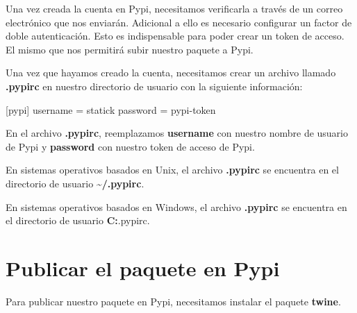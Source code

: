 \documentclass[
  a4paper,
  DIV=11,
  numbers=noendperiod,
  onepage,
  openany]{scrreprt}
\newenvironment{Shaded}{\begin{snugshade}}{\end{snugshade}}
\newcommand{\NormalTok}[1]{\textcolor[rgb]{0.00,0.23,0.31}{#1}}
\begin{document}
\begin{tcolorbox}
\begin{tcolorbox}
Una vez creada la cuenta en Pypi, necesitamos verificarla a través de un
correo electrónico que nos enviarán. Adicional a ello es necesario
configurar un factor de doble autenticación. Esto es indispensable para
poder crear un token de acceso. El mismo que nos permitirá subir nuestro
paquete a Pypi.

\end{tcolorbox}

Una vez que hayamos creado la cuenta, necesitamos crear un archivo
llamado \textbf{.pypirc} en nuestro directorio de usuario con la
siguiente información:

\begin{Shaded}
\begin{Highlighting}[]
\NormalTok{[pypi]}
\NormalTok{  username = statick}
\NormalTok{  password = pypi{-}token}
\end{Highlighting}
\end{Shaded}

En el archivo \textbf{.pypirc}, reemplazamos \textbf{username} con
nuestro nombre de usuario de Pypi y \textbf{password} con nuestro token
de acceso de Pypi.

\begin{tcolorbox}[enhanced jigsaw, colframe=quarto-callout-tip-color-frame, titlerule=0mm, breakable, opacityback=0, opacitybacktitle=0.6, colback=white, arc=.35mm, coltitle=black, toprule=.15mm, left=2mm, title=\textcolor{quarto-callout-tip-color}{\faLightbulb}\hspace{0.5em}{Tip}, leftrule=.75mm, rightrule=.15mm, bottomtitle=1mm, toptitle=1mm, bottomrule=.15mm, colbacktitle=quarto-callout-tip-color!10!white]

En sistemas operativos basados en Unix, el archivo \textbf{.pypirc} se
encuentra en el directorio de usuario \textbf{\textasciitilde/.pypirc}.

En sistemas operativos basados en Windows, el archivo \textbf{.pypirc}
se encuentra en el directorio de usuario
\textbf{C:}\Users\username.pypirc.

\end{tcolorbox}

\chapter{Publicar el paquete en Pypi}\label{publicar-el-paquete-en-pypi}

Para publicar nuestro paquete en Pypi, necesitamos instalar el paquete
\textbf{twine}.


\end{tcolorbox}
\end{document}
